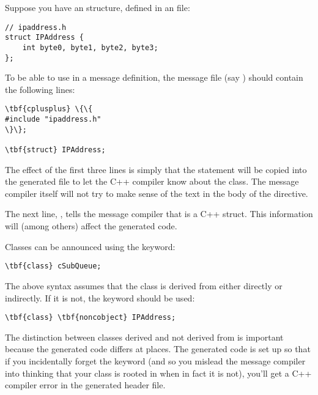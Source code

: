 Suppose you have an  structure, defined in an 
file:

\begin{verbatim}
// ipaddress.h
struct IPAddress {
    int byte0, byte1, byte2, byte3;
};
\end{verbatim}

To be able to use  in a message definition, the message
file (say ) should contain the following lines:

\begin{Verbatim}[commandchars=\\\{\}]
\tbf{cplusplus} \{\{
#include "ipaddress.h"
\}\};

\tbf{struct} IPAddress;
\end{Verbatim}

The effect of the first three lines is simply that the 
statement will be copied into the generated 
file to let the C++ compiler know about the  class.
The message compiler itself will not try to make sense of the
text in the body of the  directive.

The next line, , tells the message compiler that
 is a C++ struct. This information will (among others)
affect the generated code.

Classes can be announced using the  keyword:

\begin{Verbatim}[commandchars=\\\{\}]
\tbf{class} cSubQueue;
\end{Verbatim}

The above syntax assumes that the class is derived from 
either directly or indirectly. If it is not, the 
keyword should be used:

\begin{Verbatim}[commandchars=\\\{\}]
\tbf{class} \tbf{noncobject} IPAddress;
\end{Verbatim}

The distinction between classes derived and not derived from 
is important because the generated code differs at places.
The generated code is set up so that if you incidentally
forget the  keyword (and so you mislead the
message compiler into thinking that your class is rooted in
 when in fact it is not), you'll get a C++ compiler
error in the generated header file.



